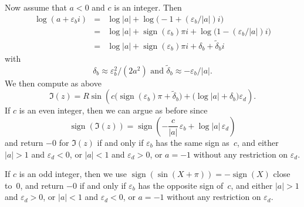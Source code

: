 \documentclass [11pt]{article}
\renewcommand {\epsilon}{\varepsilon}
\newcommand {\sign}{\operatorname{sign}}
\begin{document}
Now assume that $a < 0$ and $c$ is an integer. Then
\begin {eqnarray*}
\log (a + \epsilon_b i)
& = & \log |a| + \log \big( -1 + (\epsilon_b/|a|) i \big) \\
& = & \log |a| + \sign (\epsilon_b) \pi i
  + \log \big( 1 - (\epsilon_b/|a|) i \big) \\
& = & \log |a| + \sign (\epsilon_b) \pi i
+ \delta_b + \tilde \delta_b i
\end {eqnarray*}
with
\[
\delta_b \approx \epsilon_b^2 / (2 a^2)
\text { and }
\tilde\delta_b \approx - \epsilon_b / |a|.
\]
We then compute as above
\begin {equation}
\label {eq:pow_im}
\Im (z)
= R
\sin \left( c \big( \sign (\epsilon_b) \pi + \tilde \delta_b \big)
+ \big( \log |a| + \delta_b \big) \epsilon_d \right).
\end {equation}
If $c$ is an even integer, then we can argue as before since
\[
\sign (\Im (z))
= \sign \left( - \frac {c}{|a|} \, \epsilon_b + \log |a| \, \epsilon_d \right)
\]
and return $-0$ for $\Im(z)$ if and only if
$\epsilon_b$ has the same sign as~$c$, and
either $|a| > 1$ and $\epsilon_d < 0$,
or     $|a| < 1$ and $\epsilon_d > 0$,
or     $a = -1$ without any restriction on $\epsilon_d$.

If $c$ is an odd integer, then we use
$\sign (\sin (X + \pi)) = - \sign (X)$ close to~$0$, and
return $-0$  if and only if
$\epsilon_b$ has the opposite sign of~$c$, and
either $|a| > 1$ and $\epsilon_d > 0$,
or     $|a| < 1$ and $\epsilon_d < 0$,
or     $a = -1$ without any restriction on $\epsilon_d$.
\end{document}
